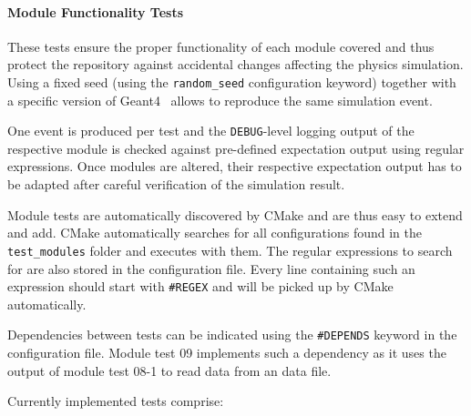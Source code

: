 \paragraph{Module Functionality Tests}

These tests ensure the proper functionality of each module covered and thus protect the repository against accidental changes affecting the physics simulation.
Using a fixed seed (using the \texttt{random\_seed} configuration keyword) together with a specific version of Geant4~\cite{geant4} allows to reproduce the same simulation event.

One event is produced per test and the \texttt{DEBUG}-level logging output of the respective module is checked against pre-defined expectation output using regular expressions.
Once modules are altered, their respective expectation output has to be adapted after careful verification of the simulation result.

Module tests are automatically discovered by CMake and are thus easy to extend and add.
CMake automatically searches for all configurations found in the \texttt{test\_modules} folder and executes \apsq with them.
The regular expressions to search for are also stored in the configuration file.
Every line containing such an expression should start with \texttt{\#REGEX} and will be picked up by CMake automatically.

Dependencies between tests can be indicated using the \texttt{\#DEPENDS} keyword in the configuration file.
Module test 09 implements such a dependency as it uses the output of module test 08-1 to read data from an \apsq data file.

Currently implemented tests comprise:

